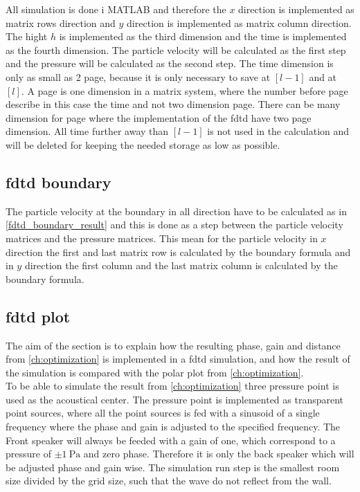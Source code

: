 All simulation is done i MATLAB and therefore the $x$ direction is implemented as matrix rows direction and $y$ direction is implemented as matrix column direction. The hight $h$ is implemented as the third dimension and the time is implemented as the fourth dimension. The particle velocity will be calculated as the first step and the pressure will be calculated as the second step. The time dimension is only as small as 2 page, because it is only necessary to save at $[l-1]$ and at $[l]$. A page is one dimension in a matrix system, where the number before page  describe in this case the time and not two dimension page. There can be many dimension for page where the implementation of the \gls{fdtd} have two page dimension.  All time further away than $[l-1]$ is not used in the calculation and will be deleted for keeping the needed storage as low as possible. 

\subsection{\gls{fdtd} boundary}
The particle velocity at the boundary in all direction have to be calculated as in \autoref{fdtd_boundary_result} and this is done as a step between the particle velocity matrices and the pressure matrices. This mean for the particle velocity in $x$ direction the first and last matrix row is calculated by the boundary formula and in $y$ direction the first column and the last matrix column is calculated by the boundary formula. 


\subsection{\gls{fdtd} plot}
The aim of the section is to explain how the resulting phase, gain and distance from \autoref{ch:optimization} is implemented in a \gls{fdtd} simulation, and how the result of the simulation is compared with the polar plot from \autoref{ch:optimization}. \\

To be able to simulate the result from \autoref{ch:optimization} three pressure point is used as the acoustical center. The pressure point is implemented as transparent point sources, where all the point sources is fed with a sinusoid of a single frequency where the phase and gain is adjusted to the specified frequency. The Front speaker will always be feeded with a gain of one, which correspond to a pressure of $\pm \SI{1}{\pascal}$ and zero phase. Therefore it is only the back speaker which will be adjusted phase and gain wise. The simulation run step is the smallest room size divided by the grid size, such that the wave do not reflect from the wall. \\

